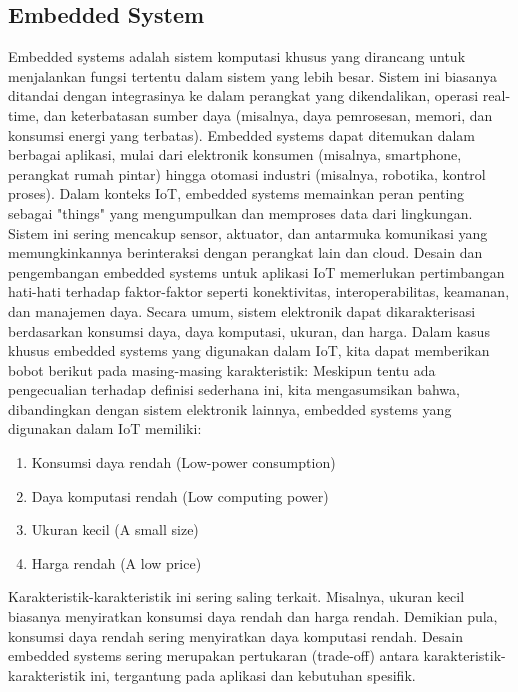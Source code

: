 \subsection{Embedded System}
Embedded systems adalah sistem komputasi khusus yang dirancang untuk menjalankan fungsi tertentu dalam sistem yang lebih besar. Sistem ini biasanya ditandai dengan integrasinya ke dalam perangkat yang dikendalikan, operasi real-time, dan keterbatasan sumber daya (misalnya, daya pemrosesan, memori, dan konsumsi energi yang terbatas). Embedded systems dapat ditemukan dalam berbagai aplikasi, mulai dari elektronik konsumen (misalnya, smartphone, perangkat rumah pintar) hingga otomasi industri (misalnya, robotika, kontrol proses).
Dalam konteks IoT, embedded systems memainkan peran penting sebagai "things" yang mengumpulkan dan memproses data dari lingkungan. Sistem ini sering mencakup sensor, aktuator, dan antarmuka komunikasi yang memungkinkannya berinteraksi dengan perangkat lain dan cloud. Desain dan pengembangan embedded systems untuk aplikasi IoT memerlukan pertimbangan hati-hati terhadap faktor-faktor seperti konektivitas, interoperabilitas, keamanan, dan manajemen daya.
Secara umum, sistem elektronik dapat dikarakterisasi berdasarkan konsumsi daya, daya komputasi, ukuran, dan harga. Dalam kasus khusus embedded systems yang digunakan dalam IoT, kita dapat memberikan bobot berikut pada masing-masing karakteristik:
Meskipun tentu ada pengecualian terhadap definisi sederhana ini, kita mengasumsikan bahwa, dibandingkan dengan sistem elektronik lainnya, embedded systems yang digunakan dalam IoT memiliki:
\begin{enumerate}
    \item Konsumsi daya rendah (Low-power consumption)
    \item Daya komputasi rendah (Low computing power)
    \item Ukuran kecil (A small size)
    \item Harga rendah (A low price)
\end{enumerate}
Karakteristik-karakteristik ini sering saling terkait. Misalnya, ukuran kecil biasanya menyiratkan konsumsi daya rendah dan harga rendah. Demikian pula, konsumsi daya rendah sering menyiratkan daya komputasi rendah. Desain embedded systems sering merupakan pertukaran (trade-off) antara karakteristik-karakteristik ini, tergantung pada aplikasi dan kebutuhan spesifik.

